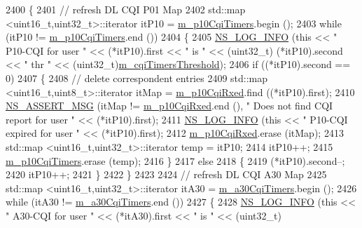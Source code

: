 \begin{DoxyCode}
2400 \{
2401   \textcolor{comment}{// refresh DL CQI P01 Map}
2402   std::map <uint16\_t,uint32\_t>::iterator itP10 = \hyperlink{classns3_1_1PssFfMacScheduler_a687c4283769d0e08724b80d4f5a5cf77}{m\_p10CqiTimers}.begin ();
2403   \textcolor{keywordflow}{while} (itP10 != \hyperlink{classns3_1_1PssFfMacScheduler_a687c4283769d0e08724b80d4f5a5cf77}{m\_p10CqiTimers}.end ())
2404     \{
2405       \hyperlink{group__logging_gafbd73ee2cf9f26b319f49086d8e860fb}{NS\_LOG\_INFO} (\textcolor{keyword}{this} << \textcolor{stringliteral}{" P10-CQI for user "} << (*itP10).first << \textcolor{stringliteral}{" is "} << (uint32\_t)
      (*itP10).second << \textcolor{stringliteral}{" thr "} << (uint32\_t)\hyperlink{classns3_1_1PssFfMacScheduler_a56d836fa470b6d79eca2b03258325373}{m\_cqiTimersThreshold});
2406       \textcolor{keywordflow}{if} ((*itP10).second == 0)
2407         \{
2408           \textcolor{comment}{// delete correspondent entries}
2409           std::map <uint16\_t,uint8\_t>::iterator itMap = \hyperlink{classns3_1_1PssFfMacScheduler_a268235ec4bf4d7e3a75840dec54bf22d}{m\_p10CqiRxed}.find ((*itP10).first);
2410           \hyperlink{assert_8h_aff5ece9066c74e681e74999856f08539}{NS\_ASSERT\_MSG} (itMap != \hyperlink{classns3_1_1PssFfMacScheduler_a268235ec4bf4d7e3a75840dec54bf22d}{m\_p10CqiRxed}.end (), \textcolor{stringliteral}{" Does not find CQI report
       for user "} << (*itP10).first);
2411           \hyperlink{group__logging_gafbd73ee2cf9f26b319f49086d8e860fb}{NS\_LOG\_INFO} (\textcolor{keyword}{this} << \textcolor{stringliteral}{" P10-CQI expired for user "} << (*itP10).first);
2412           \hyperlink{classns3_1_1PssFfMacScheduler_a268235ec4bf4d7e3a75840dec54bf22d}{m\_p10CqiRxed}.erase (itMap);
2413           std::map <uint16\_t,uint32\_t>::iterator temp = itP10;
2414           itP10++;
2415           \hyperlink{classns3_1_1PssFfMacScheduler_a687c4283769d0e08724b80d4f5a5cf77}{m\_p10CqiTimers}.erase (temp);
2416         \}
2417       \textcolor{keywordflow}{else}
2418         \{
2419           (*itP10).second--;
2420           itP10++;
2421         \}
2422     \}
2423 
2424   \textcolor{comment}{// refresh DL CQI A30 Map}
2425   std::map <uint16\_t,uint32\_t>::iterator itA30 = \hyperlink{classns3_1_1PssFfMacScheduler_aebfb8f26fbeb4ab75f566ce974f2cb65}{m\_a30CqiTimers}.begin ();
2426   \textcolor{keywordflow}{while} (itA30 != \hyperlink{classns3_1_1PssFfMacScheduler_aebfb8f26fbeb4ab75f566ce974f2cb65}{m\_a30CqiTimers}.end ())
2427     \{
2428       \hyperlink{group__logging_gafbd73ee2cf9f26b319f49086d8e860fb}{NS\_LOG\_INFO} (\textcolor{keyword}{this} << \textcolor{stringliteral}{" A30-CQI for user "} << (*itA30).first << \textcolor{stringliteral}{" is "} << (uint32\_t)

\end{DoxyCode}
